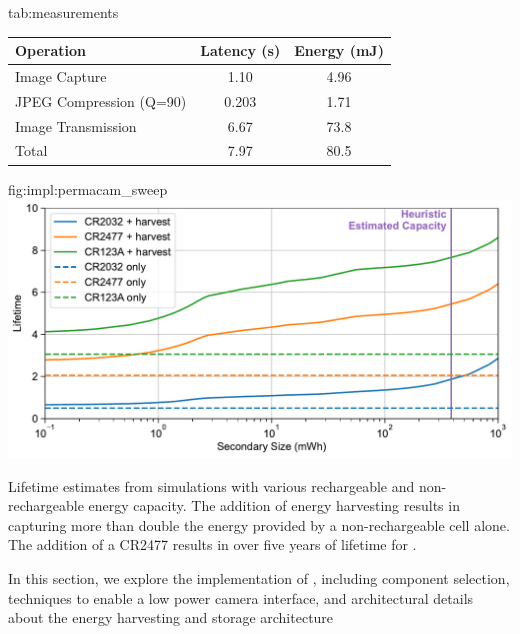 \begin{definetable}{tab:measurements}
\centering
\begin{tabular}{l S[table-format=1.3] S[table-format=2.2]}
{Operation} & {Latency (s)} & {Energy (mJ)} \\
\hline
{Image Capture}           & 1.10  & 4.96\\
{JPEG Compression (Q=90)} & 0.203 & 1.71\\
{Image Transmission}      & 6.67  & 73.8\\
\hline
Total                   & 7.97 & 80.5
\end{tabular}
\caption {
    Latency and energy measurements for key operations on \namec{}, including image capture, compression, and image transmission. Measurements are averaged over 20 images. %
}
\end{definetable}

\begin{definefigure}{fig:impl:permacam_sweep}
\centering
    \includegraphics[width=\columnwidth]{figs/chap6/permacam_simulation.pdf}
    \caption{
        Lifetime estimates from \namec simulations with various rechargeable and non-rechargeable energy capacity. The addition of energy harvesting results in capturing more than double the energy provided by a non-rechargeable cell alone. The addition of a CR2477 results in over five years of lifetime for \namec.
    }
\end{definefigure}

In this section, we explore the implementation of \namec{}, including component selection, techniques to enable a low power camera interface, and architectural details about the energy harvesting and storage architecture


